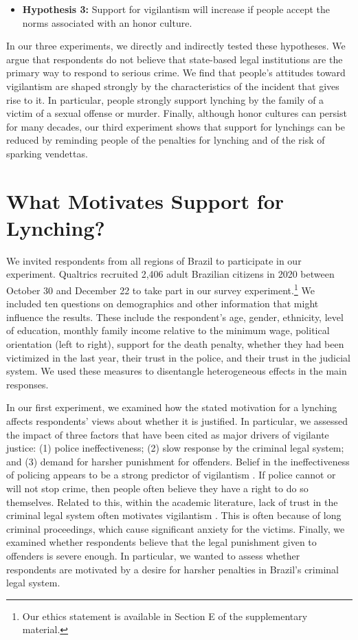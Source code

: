 \documentclass[12pt,ansiapaper]{article}
\begin{document}
\begin{itemize}
  \item \textbf{Hypothesis 3:} Support for vigilantism will increase if people accept the norms associated with an honor culture.  
  \end{itemize}

In our three experiments, we directly and indirectly tested these hypotheses. We argue that respondents do not believe that state-based legal institutions are the primary way to respond to serious crime. We find that people's attitudes toward vigilantism are shaped strongly by the characteristics of the incident that gives rise to it. In particular, people strongly support lynching by the family of a victim of a sexual offense or murder. Finally, although honor cultures can persist for many decades, our third experiment shows that support for lynchings can be reduced by reminding people of the penalties for lynching and of the risk of sparking vendettas. 


\section{What Motivates Support for Lynching?}
\label{sub:exp02}
We invited respondents from all regions of Brazil to participate in our experiment. Qualtrics recruited 2,406 adult Brazilian citizens in 2020 between October 30 and December 22 to take part in our survey experiment.\footnote{Our ethics statement is available in Section E of the supplementary material.} We included ten questions on demographics and other information that might influence the results. These include the respondent's age, gender, ethnicity, level of education, monthly family income relative to the minimum wage, political orientation (left to right), support for the death penalty, whether they had been victimized in the last year, their trust in the police, and their trust in the judicial system. We used these measures to disentangle heterogeneous effects in the main responses.

In our first experiment, we examined how the stated motivation for a lynching affects respondents' views about whether it is justified. In particular, we assessed the impact of three factors that have been cited as major drivers of vigilante justice: (1) police ineffectiveness; (2) slow response by the criminal legal system; and (3) demand for harsher punishment for offenders. Belief in the ineffectiveness of policing appears to be a strong predictor of vigilantism \citep{cruz2019determinants, garcia2019anger}. If police cannot or will not stop crime, then people often believe they have a right to do so themselves. Related to this, within the academic literature, lack of trust in the criminal legal system often motivates vigilantism \citep{godoy2004justice, smith2019contradictions}. This is often because of long criminal proceedings, which cause significant anxiety for the victims. Finally, we examined whether respondents believe that the legal punishment given to offenders is severe enough. In particular, we wanted to assess whether respondents are motivated by a desire for harsher penalties in Brazil's criminal legal system.  
\end{document}
